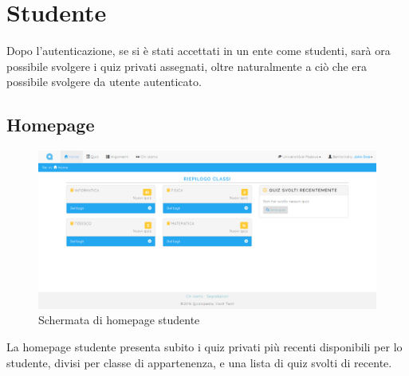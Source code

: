 \documentclass[a4paper, titlepage]{article}
\begin{document}
	 \newpage
	 \section{Studente}
	 Dopo l'autenticazione, se si è stati accettati in un ente come studenti, sarà ora possibile svolgere i quiz privati assegnati, oltre naturalmente a ciò che era possibile svolgere da utente autenticato.
	 
	 \subsection{Homepage}
	 \begin{figure}[!h]
	 	\centering
	 	\includegraphics[scale=0.33]{Img/screen_HomepageStudente.png}
	 	\caption{Schermata di homepage studente}
	 \end{figure}
	 La homepage studente presenta subito i quiz privati più recenti disponibili per lo studente, divisi per classe di appartenenza, e una lista di quiz svolti di recente.
	 
	 \newpage
\end{document}
